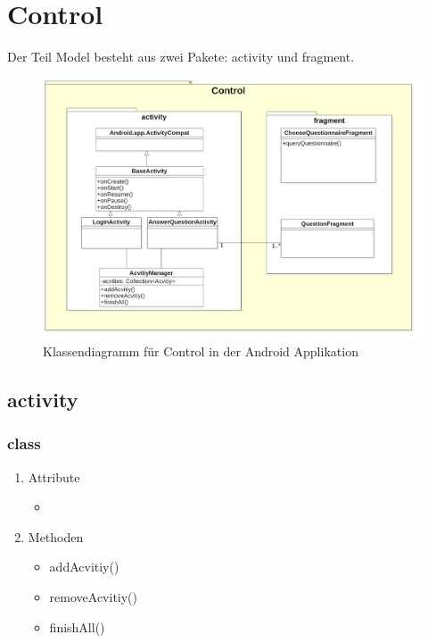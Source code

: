 \documentclass[a4paper]{scrreprt}
\begin{document}
        \section{Control}
         Der Teil Model besteht aus zwei Pakete: activity und fragment.
            \begin{figure}[H]
                \centering
                \includegraphics[scale = 0.3]{ControlClassDiagram(Android).jpg}
                \caption{Klassendiagramm für Control in der Android Applikation }
            \end{figure}

            \subsection{activity}

                \subsubsection{class }
                \begin{enumerate}
                \item Attribute
                     \begin{itemize}
                                \item {}
                     \end{itemize}
                \item Methoden
                     \begin{itemize}
                                \item addAcvitiy()
                                \item removeAcvitiy()
                                \item finishAll()
                     \end{itemize}
                \end{enumerate}
\end{document}

